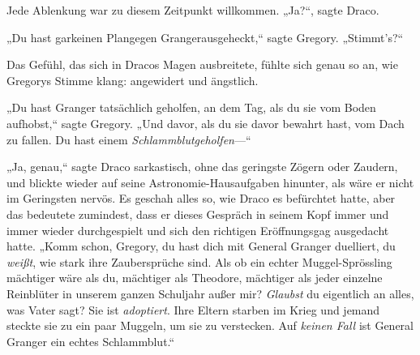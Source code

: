 Jede Ablenkung war zu diesem Zeitpunkt willkommen. „Ja?“, sagte Draco.

„Du hast garkeinen Plangegen Grangerausgeheckt,“ sagte Gregory. „Stimmt's?“

Das Gefühl, das sich in Dracos Magen ausbreitete, fühlte sich genau so an, wie Gregorys Stimme klang: angewidert und ängstlich.

„Du hast Granger tatsächlich geholfen, an dem Tag, als du sie vom Boden aufhobst,“ sagte Gregory. „Und davor, als du sie davor bewahrt hast, vom Dach zu fallen. Du hast einem \emph{Schlammblutgeholfen}—“

„Ja, genau,“ sagte Draco sarkastisch, ohne das geringste Zögern oder Zaudern, und blickte wieder auf seine Astronomie-Hausaufgaben hinunter, als wäre er nicht im Geringsten nervös. Es geschah alles so, wie Draco es befürchtet hatte, aber das bedeutete zumindest, dass er dieses Gespräch in seinem Kopf immer und immer wieder durchgespielt und sich den richtigen Eröffnungsgag ausgedacht hatte. „Komm schon, Gregory, du hast dich mit General Granger duelliert, du \emph{weißt}, wie stark ihre Zaubersprüche sind. Als ob ein echter Muggel-Sprössling mächtiger wäre als du, mächtiger als Theodore, mächtiger als jeder einzelne Reinblüter in unserem ganzen Schuljahr außer mir? \emph{Glaubst} du eigentlich an alles, was Vater sagt? Sie ist \emph{adoptiert}. Ihre Eltern starben im Krieg und jemand steckte sie zu ein paar Muggeln, um sie zu verstecken. Auf \emph{keinen Fall} ist General Granger ein echtes Schlammblut.“

